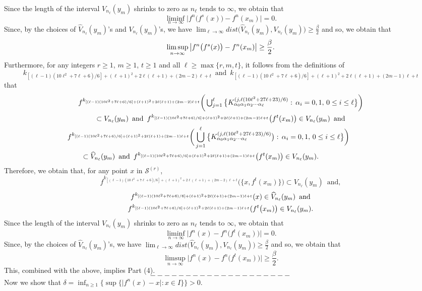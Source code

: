 \documentclass[12pt]{article}
\newcommand{\al}{\alpha}
\begin{document}
\indent Since the length of the interval $V_{n_\ell}(y_m)$ shrinks to zero as $n_\ell$ tends to $\infty$, we obtain that 
$$
\liminf_{n \to \infty} \big|f^n\big(f^s(x)\big) - f^n(x_m)\big| = 0.
$$
\indent Since, by the choices of $\widehat V_{n_\ell}(y_m)$'s and $V_{n_\ell}(y_m)$'s, we have $\lim_{\ell \to \infty} dist\big(\widehat V_{n_\ell}(y_m), V_{n_\ell}(y_m)\big) \ge \frac \beta2$ and so, we obtain that 
$$
\limsup_{n \to \infty} \big|f^n\big(f^s(x)\big) - f^n(x_m)\big| \ge \frac \beta2.\vspace{.1in}
$$
\indent Furthermore, for any integers $r \ge 1$, $m \ge 1$, $t \ge 1$ and all $\ell \ge \max \{ r, m, t \}$, it follows from the definitions of  
$$
k_{[(\ell-1)(10\ell^2+7\ell+6)/6]+(\ell+1)^2+2\ell(\ell+1)+(2m-2)\ell+t} \,\,\, \text{and} \,\,\, k_{[(\ell-1)(10\ell^2+7\ell+6)/6]+(\ell+1)^2+2\ell(\ell+1)+(2m-1)\ell+t}
$$ 
that 
\begin{multline*}
$$
f^{k_{[(\ell-1)(10\ell^2+7\ell+6)/6]+(\ell+1)^2+2\ell(\ell+1)+(2m-2)\ell+t}}\bigg(\bigcup_{j=1}^\ell \big\{ K_{\al_0\al_1\al_2\cdots\al_\ell}^{(j, \ell(10\ell^2+27\ell+23)/6)}: \, \al_i = 0, 1, \, 0 \le i \le \ell \big\}\bigg) \\ 
\subset V_{n_\ell}(y_m) \,\,\, \text{and} \,\,\, f^{k_{[(\ell-1)(10\ell^2+7\ell+6)/6]+(\ell+1)^2+2\ell(\ell+1)+(2m-2)\ell+t}}\big(f^t(x_m)\big) \in V_{n_\ell}(y_m) \,\,\, \text{and} \\
 f^{k_{[(\ell-1)(10\ell^2+7\ell+6)/6]+(\ell+1)^2+2\ell(\ell+1)+(2m-1)\ell+t}}\bigg(\bigcup_{j=1}^\ell \big\{ K_{\al_0\al_1\al_2\cdots\al_\ell}^{(j, \ell(10\ell^2+27\ell+23)/6)}\big): \, \al_i = 0, 1, \, 0 \le i \le \ell \big\}\bigg) \qquad\quad\,\,\, \\ 
\subset \widehat V_{n_\ell}(y_m) \,\,\, \text{and} \,\,\, f^{k_{[(\ell-1)(10\ell^2+7\ell+6)/6]+(\ell+1)^2+2\ell(\ell+1)+(2m-1)\ell+t}}\big(f^t(x_m)\big) \in V_{n_\ell}(y_m). \qquad\qquad\quad\,\,\,\,
$$
\end{multline*}
Therefore, we obtain that, for any point $x$ in $\mathcal S^{(r)}$,  
$$
f^{k_{[(\ell-1)(10\ell^2+7\ell+6)/6]+(\ell+1)^2+2\ell(\ell+1)+(2m-2)\ell+t}}\big(\{ x, f^t(x_m) \}\big) \subset V_{n_{\ell}}(y_m) \,\,\, \text{and},
$$
\begin{multline*}
$$
f^{k_{[(\ell-1)(10\ell^2+7\ell+6)/6]+(\ell+1)^2+2\ell(\ell+1)+(2m-1)\ell+t}}(x) \in \widehat V_{n_\ell}(y_m) \,\,\, \text{and} \\ f^{k_{[(\ell-1)(10\ell^2+7\ell+6)/6]+(\ell+1)^2+2\ell(\ell+1)+(2m-1)\ell+t}}(f^t\big(x_m)\big) \in V_{n_\ell}(y_m).
$$
\end{multline*}
\indent Since the length of the interval $V_{n_\ell}(y_m)$ shrinks to zero as $n_\ell$ tends to $\infty$, we obtain that 
$$
\liminf_{n \to \infty} \big|f^n(x) - f^n\big(f^t(x_m)\big)\big| = 0.
$$
\indent Since, by the choices of $\widehat V_{n_\ell}(y_m)$'s, we have $\lim_{\ell \to \infty} dist\big(\widehat V_{n_\ell}(y_m), V_{n_\ell}(y_m)\big) \ge \frac \beta2$ and so, we obtain that 
$$
\limsup_{n \to \infty} \big|f^n(x) - f^n\big(f^t(x_m)\big)\big| \ge \frac \beta2.
$$
\indent This, combined with the above, implies Part (4).
$$--------------------$$
\indent Now we show that $\delta = \inf_{n \ge 1} \bigg\{ \sup \big\{ \big|f^n(x) - x\big|: x \in I \big\} \bigg\} > 0$.  
\end{document}
